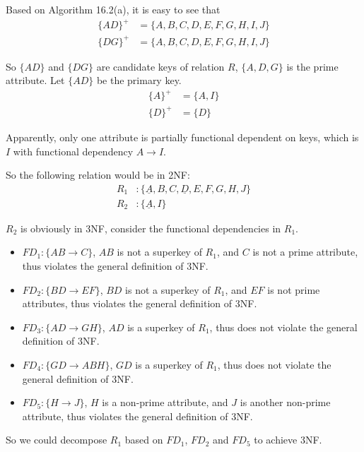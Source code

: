 \documentclass[12pt,letterpaper,titlepage,en-US]{article}
\begin{document}
\begin{homeworkProblem}
    Based on Algorithm 16.2(a), it is easy to see that
    \begin{align*}
        \{AD\}^+ &= \{A,B,C,D,E,F,G,H,I,J\} \\
        \{DG\}^+ &= \{A,B,C,D,E,F,G,H,I,J\}
    \end{align*}

    So $\{AD\}$ and $\{DG\}$ are candidate keys of relation $R$, $\{A, D, G\}$ is the prime attribute. Let $\{AD\}$ be the primary key.
    \begin{align*}
        \{A\}^+ &= \{A, I\}\\
        \{D\}^+ &= \{D\}
    \end{align*}

    Apparently, only one attribute is partially functional dependent on keys,
    which is $I$ with functional dependency $A \rightarrow I$.

    So the following relation would be in 2NF:
    \begin{align*}
        R_1& : \{\underline{A}, B, C, \underline{D}, E, F, G, H, J\}\\
        R_2& : \{\underline{A}, I\}
    \end{align*}

    $R_2$ is obviously in 3NF,
    consider the functional dependencies in $R_1$.
    \begin{itemize}
        \item $FD_1: \{AB \rightarrow C\}$, $AB$ is not a superkey of $R_1$,
            and $C$ is not a prime attribute,
            thus violates the general definition of 3NF.
        \item $FD_2: \{BD \rightarrow EF\}$, $BD$ is not a superkey of $R_1$,
            and $EF$ is not prime attributes,
            thus violates the general definition of 3NF.
        \item $FD_3: \{AD \rightarrow GH\}$, $AD$ is a superkey of $R_1$,
            thus does not violate the general definition of 3NF.
        \item $FD_4: \{GD \rightarrow ABH\}$, $GD$ is a superkey of $R_1$,
            thus does not violate the general definition of 3NF.
        \item $FD_5: \{H \rightarrow J\}$, $H$ is a non-prime attribute,
            and $J$ is another non-prime attribute,
            thus violates the general definition of 3NF.
    \end{itemize}

    So we could decompose $R_1$ based on $FD_1$, $FD_2$ and $FD_5$ to achieve 3NF.


\end{homeworkProblem}
\end{document}
